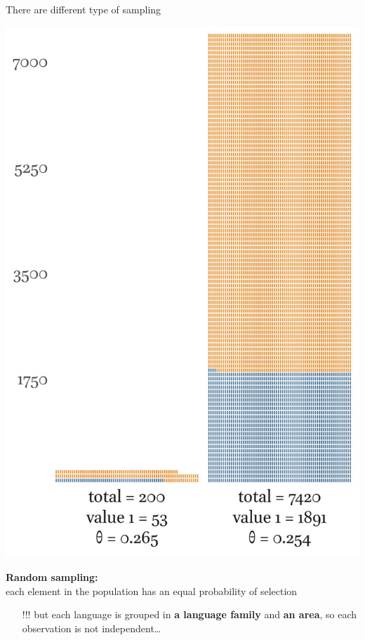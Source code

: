 \documentclass[13pt, t]{beamer}
\begin{document}
\begin{frame}{There are different type of sampling}
\begin{multicols}{2}
\includegraphics[width=\linewidth]{images/03_simple_sample}
\columnbreak

\textbf{Random sampling:}\\
each element in the population has an equal probability of selection \pause\\
\begin{itemize}
\item[\color{colorblue}!!!] but each language is grouped in \textbf{a language family} and \textbf{an area}, so each observation is not independent\dots
\end{itemize}

\end{multicols}
\end{frame}
\end{document}
